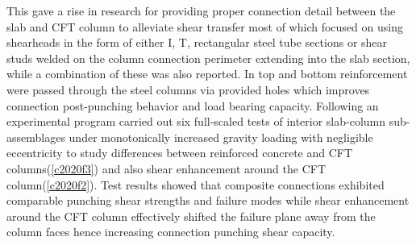 \documentclass[twocolumn]{article} %
\begin{document}
This gave a rise in research for providing proper connection detail between the slab and CFT column to alleviate shear transfer most of which focused on using shearheads\citep{satoh2004experimental,LEE2008418,yamaguchi2008experimental,EDER20111164,EDER2012239,JU2013297,kim2014shearhead,yan2014,Bompa2016a,lee2019seismic} in the form of either I, T, rectangular steel tube sections or shear studs welded on the column connection perimeter extending into the slab section\citep{yu2018}, while a combination of these was also reported\citep{LEE2008418}. In \cite{yan2014,LEE2008418} top and bottom reinforcement were passed through the steel columns via provided holes which improves connection post-punching behavior and load bearing capacity. Following an experimental program \cite{chen2020} carried out six full-scaled tests of interior slab-column sub-assemblages under monotonically increased gravity loading with negligible eccentricity to study differences between reinforced concrete and CFT columns(\ref{c2020f3}) and also shear enhancement around the CFT column(\ref{c2020f2}). Test results showed that composite connections exhibited comparable punching shear strengths and failure modes while shear enhancement around the CFT column effectively shifted the failure plane away from the column faces hence increasing connection punching shear capacity\citep{chen2020}.
\end{document}

